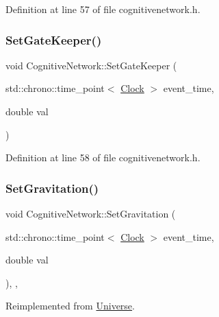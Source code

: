Definition at line 57 of file cognitivenetwork.\+h.

\mbox{\label{class_cognitive_network_a83bc4047721417212fa1bbbfa64da5ee}} 
\subsubsection{\texorpdfstring{Set\+Gate\+Keeper()}{SetGateKeeper()}}
{\footnotesize\ttfamily void Cognitive\+Network\+::\+Set\+Gate\+Keeper (\begin{DoxyParamCaption}\item[{std\+::chrono\+::time\+\_\+point$<$ \hyperlink{universe_8h_a0ef8d951d1ca5ab3cfaf7ab4c7a6fd80}{Clock} $>$}]{event\+\_\+time,  }\item[{double}]{val }\end{DoxyParamCaption})\hspace{0.3cm}{\ttfamily [inline]}}



Definition at line 58 of file cognitivenetwork.\+h.

\mbox{\label{class_cognitive_network_af9f082a70f0cc25a3f818d9eace5a527}} 
\subsubsection{\texorpdfstring{Set\+Gravitation()}{SetGravitation()}}
{\footnotesize\ttfamily void Cognitive\+Network\+::\+Set\+Gravitation (\begin{DoxyParamCaption}\item[{std\+::chrono\+::time\+\_\+point$<$ \hyperlink{universe_8h_a0ef8d951d1ca5ab3cfaf7ab4c7a6fd80}{Clock} $>$}]{event\+\_\+time,  }\item[{double}]{val }\end{DoxyParamCaption})\hspace{0.3cm}{\ttfamily [inline]}, {\ttfamily [final]}, {\ttfamily [virtual]}}



Reimplemented from \hyperlink{class_universe_ae0cb8d86b2fbb8396d605160344b42f5}{Universe}.



